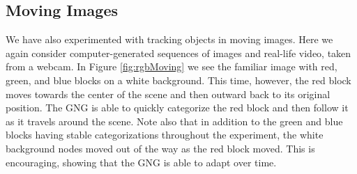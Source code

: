 \documentclass{article}
\renewcommand{\|}{\origbar} %
\begin{document}
\subsection{Moving Images}

We have also experimented with tracking objects in moving images. Here we again consider computer-generated sequences of images and real-life video, taken from a webcam. In Figure \ref{fig:rgbMoving} we see the familiar image with red, green, and blue blocks on a white background. This time, however, the red block moves towards the center of the scene and then outward back to its original position. The GNG is able to quickly categorize the red block and then follow it as it travels around the scene. Note also that in addition to the green and blue blocks having stable categorizations throughout the experiment, the white background nodes moved out of the way as the red block moved. This is encouraging, showing that the GNG is able to adapt over time.
\end{document}
